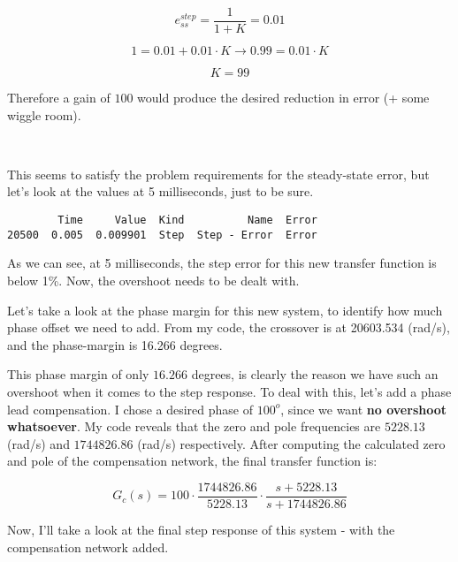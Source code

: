 \documentclass[11pt]{article}
\begin{document}
\[e_{ss}^{step}=\frac{1}{1+K}=0.01\]

\[1=0.01+0.01\cdot K \rightarrow 0.99=0.01\cdot K\]

\[K=99\]

Therefore a gain of \(100\) would produce the desired reduction in error
(+ some wiggle room).

    \begin{center}
    \end{center}
    { \hspace*{\fill} \\}
    
    This seems to satisfy the problem requirements for the steady-state
error, but let's look at the values at 5 milliseconds, just to be sure.

    
    \begin{verbatim}
        Time     Value  Kind          Name  Error
20500  0.005  0.009901  Step  Step - Error  Error
    \end{verbatim}

    
    As we can see, at 5 milliseconds, the step error for this new transfer
function is below 1\%. Now, the overshoot needs to be dealt with.

Let's take a look at the phase margin for this new system, to identify
how much phase offset we need to add. From my code, the crossover is at 20603.534 (rad/s), and the phase-margin is 16.266 degrees.
    
    This phase margin of only \(16.266\) degrees, is clearly the reason we
have such an overshoot when it comes to the step response. To deal with
this, let's add a phase lead compensation. I chose a desired phase of
\(100^o\), since we want \textbf{no overshoot whatsoever}. My code reveals that the zero and pole frequencies are $5228.13$ (rad/s) and $1744826.86$ (rad/s) respectively.
    After computing the calculated zero and pole of the compensation
network, the final transfer function is:

\[G_c(s)=100\cdot \frac{1744826.86}{5228.13}\cdot \frac{s+5228.13}{s+1744826.86}\]

Now, I'll take a look at the final step response of this system - with
the compensation network added.

    \begin{center}
    \end{center}
    { \hspace*{\fill} \\}
    
\end{document}
